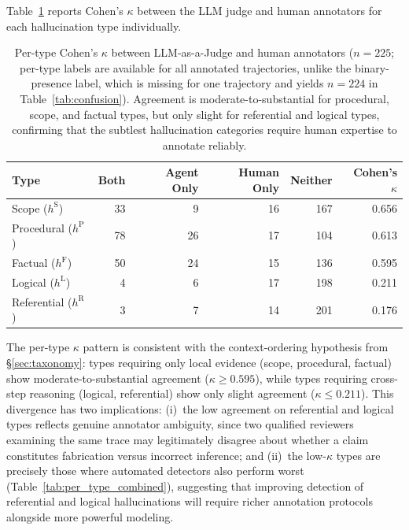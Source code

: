 \documentclass{article}
\begin{document}
Table~\ref{tab:per_type_kappa} reports Cohen's $\kappa$ between the LLM judge and human annotators for each hallucination type individually.

\begin{table}[t]
\caption{Per-type Cohen's $\kappa$ between LLM-as-a-Judge and human annotators ($n = 225$; per-type labels are available for all annotated trajectories, unlike the binary-presence label, which is missing for one trajectory and yields $n = 224$ in Table~\ref{tab:confusion}). Agreement is moderate-to-substantial for procedural, scope, and factual types, but only slight for referential and logical types, confirming that the subtlest hallucination categories require human expertise to annotate reliably.}
\label{tab:per_type_kappa}
\centering
\small
\begin{tabular}{lrrrrr}
\toprule
\textbf{Type} & \textbf{Both} & \textbf{Agent Only} & \textbf{Human Only} & \textbf{Neither} & \textbf{Cohen's $\kappa$} \\
\midrule
Scope ($h^{\text{S}}$)       & 33 &  9 & 16 & 167 & 0.656 \\
Procedural ($h^{\text{P}}$)  & 78 & 26 & 17 & 104 & 0.613 \\
Factual ($h^{\text{F}}$)     & 50 & 24 & 15 & 136 & 0.595 \\
Logical ($h^{\text{L}}$)     &  4 &  6 & 17 & 198 & 0.211 \\
Referential ($h^{\text{R}}$) &  3 &  7 & 14 & 201 & 0.176 \\
\bottomrule
\end{tabular}
\end{table}

The per-type $\kappa$ pattern is consistent with the context-ordering hypothesis from \S\ref{sec:taxonomy}: types requiring only local evidence (scope, procedural, factual) show moderate-to-substantial agreement ($\kappa \geq 0.595$), while types requiring cross-step reasoning (logical, referential) show only slight agreement ($\kappa \leq 0.211$). This divergence has two implications: (i)~the low agreement on referential and logical types reflects genuine annotator ambiguity, since two qualified reviewers examining the same trace may legitimately disagree about whether a claim constitutes fabrication versus incorrect inference; and (ii)~the low-$\kappa$ types are precisely those where automated detectors also perform worst (Table~\ref{tab:per_type_combined}), suggesting that improving detection of referential and logical hallucinations will require richer annotation protocols alongside more powerful modeling.
\end{document}
